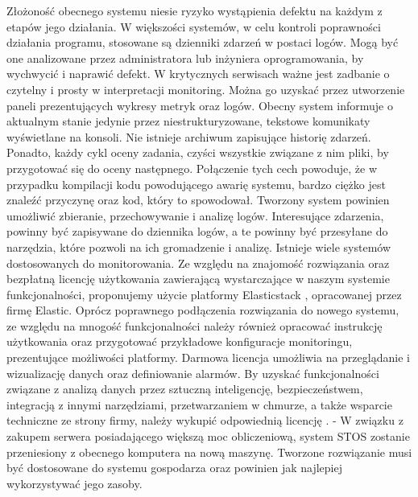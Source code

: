 \newline \indent Złożoność obecnego systemu niesie ryzyko wystąpienia defektu na każdym z etapów jego działania. W większości systemów, w celu kontroli poprawności działania programu, stosowane są dzienniki zdarzeń w postaci logów. Mogą być one analizowane przez administratora lub inżyniera oprogramowania, by wychwycić i naprawić defekt. W krytycznych serwisach ważne jest zadbanie o czytelny i prosty w interpretacji monitoring. Można go uzyskać przez utworzenie paneli prezentujących wykresy metryk oraz logów. Obecny system informuje o aktualnym stanie jedynie przez niestrukturyzowane, tekstowe komunikaty wyświetlane na konsoli. Nie istnieje archiwum zapisujące historię zdarzeń. Ponadto, każdy cykl oceny zadania, czyści wszystkie związane z nim pliki, by przygotować się do oceny następnego. Połączenie tych cech powoduje, że w przypadku kompilacji kodu powodującego awarię systemu, bardzo ciężko jest znaleźć przyczynę oraz kod, który to spowodował. Tworzony system powinien umożliwić zbieranie, przechowywanie i analizę logów. Interesujące zdarzenia, powinny być zapisywane do dziennika logów, a te powinny być przesyłane do narzędzia, które pozwoli na ich gromadzenie i analizę. Istnieje wiele systemów dostosowanych do monitorowania. Ze względu na znajomość rozwiązania oraz bezpłatną licencję użytkowania zawierającą wystarczające w naszym systemie funkcjonalności, proponujemy użycie platformy Elasticstack \cite{elastic}, opracowanej przez firmę Elastic. Oprócz poprawnego podłączenia rozwiązania do nowego systemu, ze względu na mnogość funkcjonalności należy również opracować instrukcję użytkowania oraz przygotować przykładowe konfiguracje monitoringu, prezentujące możliwości platformy. Darmowa licencja umożliwia na przeglądanie i wizualizację danych oraz definiowanie alarmów. By uzyskać funkcjonalności związane z analizą danych przez sztuczną inteligencję, bezpieczeństwem, integracją z innymi narzędziami, przetwarzaniem w chmurze, a także wsparcie techniczne ze strony firmy, należy wykupić odpowiednią licencję \cite{elasticLicencje}.
\newline \indent- W związku z zakupem serwera posiadającego większą moc obliczeniową, system STOS zostanie przeniesiony z obecnego komputera na nową maszynę. Tworzone rozwiązanie musi być dostosowane do systemu gospodarza oraz powinien jak najlepiej wykorzystywać jego zasoby.
